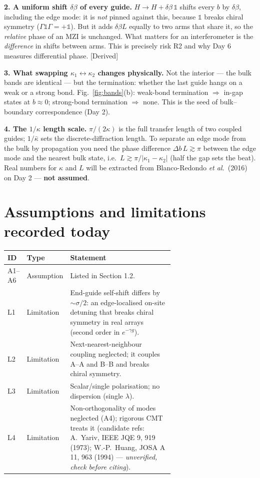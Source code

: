 \documentclass[10pt,a4paper]{article}
\newcommand{\kb}{\bar\kappa}
\newcommand{\ka}{\kappa_1}
\newcommand{\kc}{\kappa_2}
\newcommand{\evd}[1]{\textsf{\small[#1]}}
\begin{document}
\textbf{2. A uniform shift $\delta\beta$ of every guide.} $H\to H+\delta\beta\,\mathbb 1$ shifts every $b$ by $\delta\beta$, including the edge mode: it is \emph{not} pinned against this, because $\mathbb1$ breaks chiral symmetry ($\Gamma\mathbb1\Gamma=+\mathbb1$). But it adds $\delta\beta L$ equally to two arms that share it, so the \emph{relative} phase of an MZI is unchanged. What matters for an interferometer is the \emph{difference} in shifts between arms. This is precisely risk R2 and why Day 6 measures differential phase. \evd{Derived}

\textbf{3. What swapping $\ka\leftrightarrow\kc$ changes physically.} Not the interior --- the bulk bands are identical --- but the termination: whether the last guide hangs on a weak or a strong bond. Fig.~\ref{fig:bands}(b): weak-bond termination $\Rightarrow$ in-gap states at $b\approx0$; strong-bond termination $\Rightarrow$ none. This is the seed of bulk--boundary correspondence (Day 2).

\textbf{4. The $1/\kappa$ length scale.} $\pi/(2\kappa)$ is the full transfer length of two coupled guides; $1/\kb$ sets the discrete-diffraction length. To separate an edge mode from the bulk by propagation you need the phase difference $\Delta b\,L\gtrsim\pi$ between the edge mode and the nearest bulk state, i.e.\ $L\gtrsim\pi/|\ka-\kc|$ (half the gap sets the beat). Real numbers for $\kappa$ and $L$ will be extracted from Blanco-Redondo \emph{et al.}\ (2016) on Day 2 --- \textbf{not assumed}.

\section{Assumptions and limitations recorded today}
\begin{tabular}{@{}llp{0.66\linewidth}@{}}\toprule
ID&Type&Statement\\\midrule
A1--A6&Assumption&Listed in Section 1.2.\\
L1&Limitation&End-guide self-shift differs by $\sim\sigma/2$: an edge-localised on-site detuning that breaks chiral symmetry in real arrays (second order in $e^{-\gamma g}$).\\
L2&Limitation&Next-nearest-neighbour coupling neglected; it couples A--A and B--B and breaks chiral symmetry.\\
L3&Limitation&Scalar/single polarisation; no dispersion (single $\lambda$).\\
L4&Limitation&Non-orthogonality of modes neglected (A4); rigorous CMT treats it (candidate refs: A.~Yariv, IEEE JQE 9, 919 (1973); W.-P.~Huang, JOSA A 11, 963 (1994) --- \emph{unverified, check before citing}).\\\bottomrule
\end{tabular}
\end{document}
